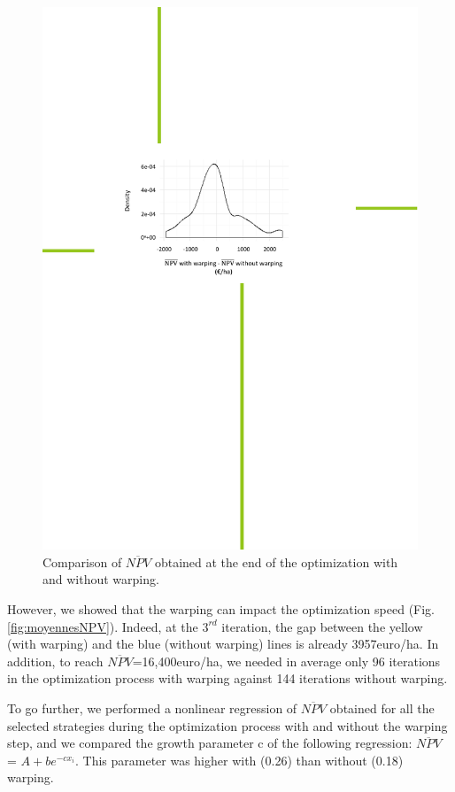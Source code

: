 \begin{figure}[!ht]
	\centering
	\includegraphics[trim = 2.7cm 13.6cm 3.2cm 7cm, clip, width=\textwidth]{Figure_Warping_density.pdf}
	\caption{Comparison of $\overline{NPV}$ obtained at the end of the optimization with and without warping. }\label{fig:waping_moins_sanswarping}
\end{figure}

However, we showed that the warping can impact the optimization speed (Fig.\ref{fig:moyennesNPV}).
Indeed, at the $3^{rd}$ iteration, the gap between the yellow (with warping) and the blue (without warping) lines is already 3957euro/ha. In addition, to reach $\overline{NPV}$=16,400euro/ha, we needed in average only 96 iterations in the optimization process with warping against 144 iterations without warping.

To go further, we performed a nonlinear regression of $\overline{NPV}$ obtained for all the selected strategies during the optimization process with 
and without the warping step, and we compared the growth parameter c of the following regression:
$\overline{NPV}$ = $A + be^{-cx_i}$. 
This parameter was higher with (0.26) than without (0.18) warping. 

